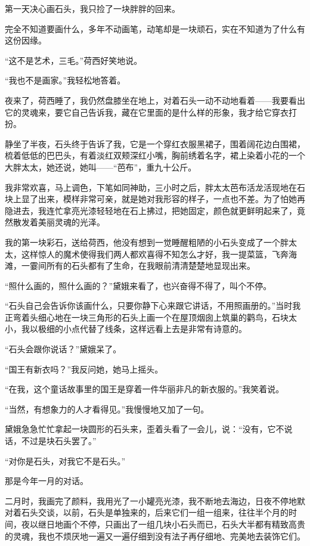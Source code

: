 \par 第一天决心画石头，我只捡了一块胖胖的回来。
\par 完全不知道要画什么，多年不动画笔，动笔却是一块顽石，实在不知道为了什么有这份因缘。
\par “这不是艺术，三毛。”荷西好笑地说。
\par “我也不是画家。”我轻松地答着。
\par 夜来了，荷西睡了，我仍然盘膝坐在地上，对着石头一动不动地看着——我要看出它的灵魂来，要它自己告诉我，藏在它里面的是什么样的形象，我才给它穿衣打扮。
\par 静坐了半夜，石头终于告诉了我，它是一个穿红衣服黑裙子，围着阔花边白围裙，梳着低低的巴巴头，有着淡红双颊深红小嘴，胸前绣着名字，裙上染着小花的一个大胖太太，她还说，她叫——“芭布”，重九十公斤。
\par 我非常欢喜，马上调色，下笔如同神助，三小时之后，胖太太芭布活龙活现地在石块上显了出来，模样非常可亲，就是她对我形容的样子，一点也不差。为了怕她再隐进去，我连忙拿亮光漆轻轻地在石上拂过，把她固定，颜色就更鲜明起来了，竟然散发着美丽灵魂的光泽。
\par 我的第一块彩石，送给荷西，他没有想到一觉睡醒粗陋的小石头变成了一个胖太太，这样惊人的魔术使得我们两人都欢喜得不知怎么才好，我一提菜篮，飞奔海滩，一霎间所有的石头都有了生命，在我眼前清清楚楚地显现出来。
\par “照什么画的，照什么画的？”黛娥来看了，也兴奋得不得了，叫个不停。
\par “石头自己会告诉你该画什么，只要你静下心来跟它讲话，不用照画册的。”当时我正弯着头细心地在一块三角形的石头上画一个在屋顶烟囱上筑巢的鹳鸟，石块太小，我以极细的小点代替了线条，这样远看上去是非常有诗意的。
\par “石头会跟你说话？”黛娥呆了。
\par “国王有新衣吗？”我反问她，她马上摇头。
\par “在我，这个童话故事里的国王是穿着一件华丽非凡的新衣服的。”我笑着说。
\par “当然，有想象力的人才看得见。”我慢慢地又加了一句。
\par 黛娥急急忙忙拿起一块圆形的石头来，歪着头看了一会儿，说：“没有，它不说话，不过是块石头罢了。”
\par “对你是石头，对我它不是石头。”
\par 那是今年一月的对话。
\par 二月时，我画完了颜料，我用光了一小罐亮光漆，我不断地去海边，日夜不停地默对着石头交谈，以前，石头是单独来的，后来它们一组一组来，往往半个月的时间，夜以继日地画个不停，只画出了一组几块小石头而已，石头大半都有精致高贵的灵魂，我也不烦厌地一遍又一遍仔细到没有法子再仔细地、完美地去装饰它们。
